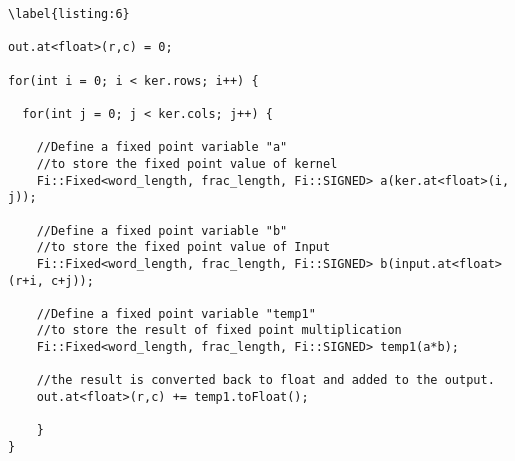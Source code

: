
\lstset{framesep=-10pt, xleftmargin=-10pt}
\begin{lstlisting}[caption={Two Dimensional Convolution Operation Code Snippet},label={fig:Custom Filter 2d}]
\label{listing:6}

out.at<float>(r,c) = 0;

for(int i = 0; i < ker.rows; i++) {

  for(int j = 0; j < ker.cols; j++) {   
    
    //Define a fixed point variable "a"
    //to store the fixed point value of kernel
    Fi::Fixed<word_length, frac_length, Fi::SIGNED> a(ker.at<float>(i, j));
    
    //Define a fixed point variable "b" 
    //to store the fixed point value of Input
    Fi::Fixed<word_length, frac_length, Fi::SIGNED> b(input.at<float>(r+i, c+j));
    
    //Define a fixed point variable "temp1" 
    //to store the result of fixed point multiplication
    Fi::Fixed<word_length, frac_length, Fi::SIGNED> temp1(a*b);
    
    //the result is converted back to float and added to the output.
	out.at<float>(r,c) += temp1.toFloat();
	
	}
}
\end{lstlisting}
